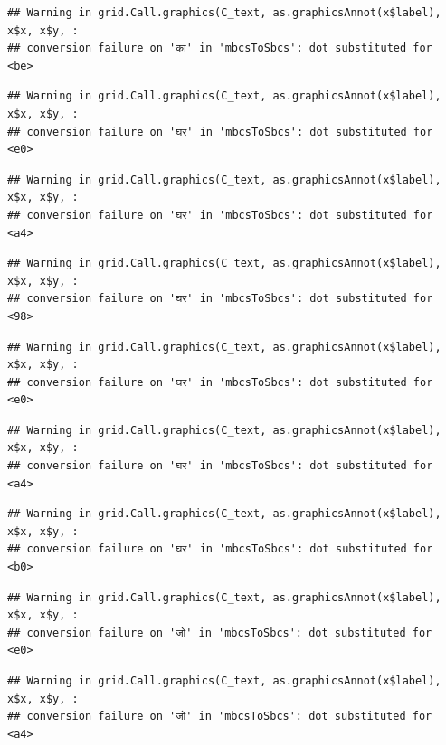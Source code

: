 \documentclass[
]{article}
\begin{document}
\begin{verbatim}
## Warning in grid.Call.graphics(C_text, as.graphicsAnnot(x$label), x$x, x$y, :
## conversion failure on 'का' in 'mbcsToSbcs': dot substituted for <be>
\end{verbatim}

\begin{verbatim}
## Warning in grid.Call.graphics(C_text, as.graphicsAnnot(x$label), x$x, x$y, :
## conversion failure on 'घर' in 'mbcsToSbcs': dot substituted for <e0>
\end{verbatim}

\begin{verbatim}
## Warning in grid.Call.graphics(C_text, as.graphicsAnnot(x$label), x$x, x$y, :
## conversion failure on 'घर' in 'mbcsToSbcs': dot substituted for <a4>
\end{verbatim}

\begin{verbatim}
## Warning in grid.Call.graphics(C_text, as.graphicsAnnot(x$label), x$x, x$y, :
## conversion failure on 'घर' in 'mbcsToSbcs': dot substituted for <98>
\end{verbatim}

\begin{verbatim}
## Warning in grid.Call.graphics(C_text, as.graphicsAnnot(x$label), x$x, x$y, :
## conversion failure on 'घर' in 'mbcsToSbcs': dot substituted for <e0>
\end{verbatim}

\begin{verbatim}
## Warning in grid.Call.graphics(C_text, as.graphicsAnnot(x$label), x$x, x$y, :
## conversion failure on 'घर' in 'mbcsToSbcs': dot substituted for <a4>
\end{verbatim}

\begin{verbatim}
## Warning in grid.Call.graphics(C_text, as.graphicsAnnot(x$label), x$x, x$y, :
## conversion failure on 'घर' in 'mbcsToSbcs': dot substituted for <b0>
\end{verbatim}

\begin{verbatim}
## Warning in grid.Call.graphics(C_text, as.graphicsAnnot(x$label), x$x, x$y, :
## conversion failure on 'जो' in 'mbcsToSbcs': dot substituted for <e0>
\end{verbatim}

\begin{verbatim}
## Warning in grid.Call.graphics(C_text, as.graphicsAnnot(x$label), x$x, x$y, :
## conversion failure on 'जो' in 'mbcsToSbcs': dot substituted for <a4>
\end{verbatim}
\end{document}
